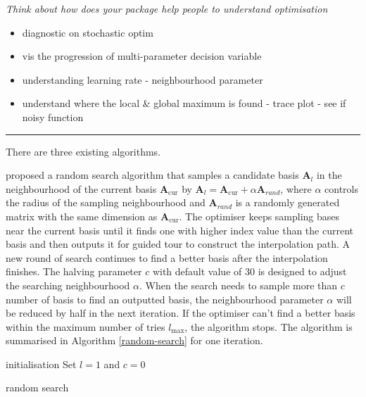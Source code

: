 \documentclass[12pt]{article}
\providecommand{\tightlist}{%
  \setlength{\itemsep}{0pt}\setlength{\parskip}{0pt}}
\begin{document}
\emph{Think about how does your package help people to understand
optimisation}

\begin{itemize}
\tightlist
\item
  diagnostic on stochastic optim
\item
  vis the progression of multi-parameter decision variable
\item
  understanding learning rate - neighbourhood parameter
\item
  understand where the local \& global maximum is found - trace plot -
  see if noisy function
\end{itemize}

\begin{center}\rule{0.5\linewidth}{0.5pt}\end{center}

There are three existing algorithms.

\citet{posse1995projection} proposed a random search algorithm that
samples a candidate basis \(\mathbf{A}_{l}\) in the neighbourhood of the
current basis \(\mathbf{A}_{\text{cur}}\) by
\(\mathbf{A}_{l} = \mathbf{A}_{\text{cur}} + \alpha \mathbf{A}_{rand}\),
where \(\alpha\) controls the radius of the sampling neighbourhood and
\(\mathbf{A}_{rand}\) is a randomly generated matrix with the same
dimension as \(\mathbf{A}_{\text{cur}}\). The optimiser keeps sampling
bases near the current basis until it finds one with higher index value
than the current basis and then outputs it for guided tour to construct
the interpolation path. A new round of search continues to find a better
basis after the interpolation finishes. The halving parameter \(c\) with
default value of 30 is designed to adjust the searching neighbourhood
\(\alpha\). When the search needs to sample more than \(c\) number of
basis to find an outputted basis, the neighbourhood parameter \(\alpha\)
will be reduced by half in the next iteration. If the optimiser can't
find a better basis within the maximum number of tries \(l_{\max}\), the
algorithm stops. The algorithm is summarised in Algorithm
\ref{random-search} for one iteration.

\begin{algorithm}
\SetAlgoLined
  initialisation\;
  Set $l = 1$ and $c = 0$\;
  \caption{random search}
  \label{random-search}
\end{algorithm}
\end{document}
